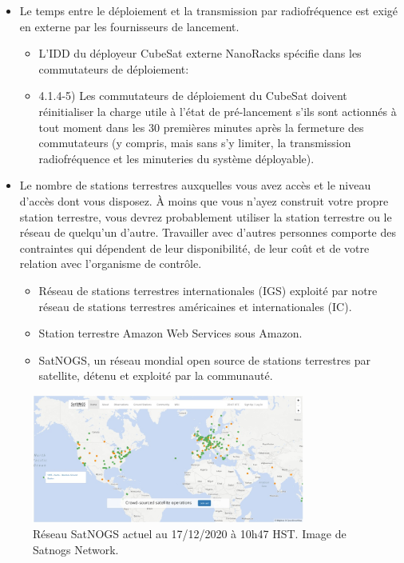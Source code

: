\begin{itemize}
    \item Le temps entre le déploiement et la transmission par radiofréquence est exigé en externe par les fournisseurs de lancement.
    \begin{itemize}
        \item L'IDD du déployeur CubeSat externe NanoRacks spécifie dans les commutateurs de déploiement:
        \item 4.1.4-5) Les commutateurs de déploiement du CubeSat doivent réinitialiser la charge utile à l'état de pré-lancement s'ils sont actionnés à tout moment dans les 30 premières minutes après la fermeture des commutateurs (y compris, mais sans s'y limiter, la transmission radiofréquence et les minuteries du système déployable).
     \end{itemize}
    \item Le nombre de stations terrestres auxquelles vous avez accès et le niveau d'accès dont vous disposez. À moins que vous n'ayez construit votre propre station terrestre, vous devrez probablement utiliser la station terrestre ou le réseau de quelqu'un d'autre. Travailler avec d'autres personnes comporte des contraintes qui dépendent de leur disponibilité, de leur coût et de votre relation avec l'organisme de contrôle.
    \begin{itemize}
        \item Réseau de stations terrestres internationales (IGS) exploité par notre réseau de stations terrestres américaines et internationales (IC).
        \item Station terrestre Amazon Web Services sous Amazon.
        \item SatNOGS, un réseau mondial open source de stations terrestres par satellite, détenu et exploité par la communauté.
    \end{itemize}
\end{itemize}
\begin{figure}[H] %
    \centering
    \includegraphics[width=0.8\textwidth]{figures/6-10.jpg}
    
    \caption{Réseau SatNOGS actuel au 17/12/2020 à 10h47 HST. Image de Satnogs Network.}
    \label{fig:communication2}
\end{figure}
